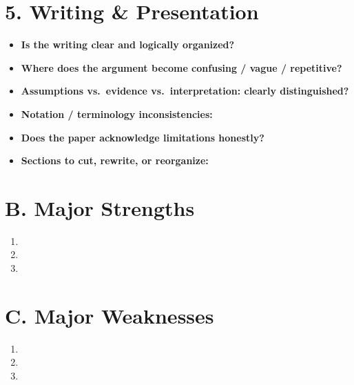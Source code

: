 \documentclass[11pt, letterpaper]{article}
\begin{document}
\section{5. Writing \& Presentation}

\begin{itemize}[leftmargin=*, nosep]
  \item \textbf{Is the writing clear and logically organized?}
  \vspace{1.5cm}
  \item \textbf{Where does the argument become confusing / vague / repetitive?}
  \vspace{1.5cm}
  \item \textbf{Assumptions vs.\ evidence vs.\ interpretation: clearly distinguished?}
  \vspace{1.5cm}
  \item \textbf{Notation / terminology inconsistencies:}
  \vspace{1.5cm}
  \item \textbf{Does the paper acknowledge limitations honestly?}
  \vspace{1.5cm}
  \item \textbf{Sections to cut, rewrite, or reorganize:}
  \vspace{1.5cm}
\end{itemize}

\section*{B. Major Strengths}
\begin{enumerate}[leftmargin=*, nosep]
  \item \vspace{1.2cm}
  \item \vspace{1.2cm}
  \item \vspace{1.2cm}
\end{enumerate}

\section*{C. Major Weaknesses}
\begin{enumerate}[leftmargin=*, nosep]
  \item \vspace{1.2cm}
  \item \vspace{1.2cm}
  \item \vspace{1.2cm}
\end{enumerate}
\end{document}

